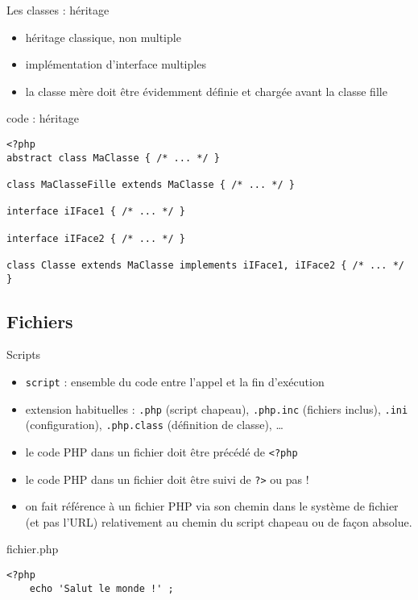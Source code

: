 \begin{frame}[containsverbatim]{Les classes : héritage}
\begin{itemize}
\item héritage classique, non multiple
\item implémentation d'interface multiples
\item la classe mère doit être évidemment définie et chargée avant la classe fille
\end{itemize}
\begin{block}{code : héritage}
\begin{lstlisting}
<?php
abstract class MaClasse { /* ... */ }

class MaClasseFille extends MaClasse { /* ... */ }

interface iIFace1 { /* ... */ }

interface iIFace2 { /* ... */ }

class Classe extends MaClasse implements iIFace1, iIFace2 { /* ... */ } 
\end{lstlisting}
\end{block}
\end{frame}

\subsection{Fichiers}

\begin{frame}[containsverbatim]{Scripts}
\begin{itemize}
\item \texttt{script} : ensemble du code entre l'appel et la fin d'exécution
\item extension habituelles : \texttt{.php} (script chapeau), \texttt{.php.inc} (fichiers inclus), \texttt{.ini} (configuration), \texttt{.php.class} (définition de classe), \ldots
\item le code PHP dans un fichier doit être précédé de \texttt{<?php}
\item le code PHP dans un fichier doit être suivi de \texttt{?>} ou pas !
\item on fait référence à un fichier PHP via son chemin dans le système de fichier (et pas l'URL) relativement au chemin du script chapeau ou de façon absolue.
\end{itemize}
\begin{block}{fichier.php}
\begin{lstlisting}
<?php
	echo 'Salut le monde !' ;
\end{lstlisting}
\end{block}
\end{frame}

